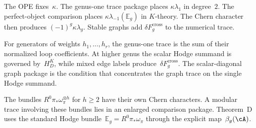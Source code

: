 \begin{remark}
\label{rem:universality-hierarchy}
The OPE fixes~$\kappa$.  The genus-one trace package places
$\kappa\lambda_1$ in degree~$2$.  The perfect-object comparison
places $\kappa\lambda_{-1}(\mathbb E_g)$ in $K$-theory.  The Chern
character then produces $(-1)^g\kappa\lambda_g$.  Stable graphs add
$\delta F_g^{\mathrm{cross}}$ to the numerical trace.
\end{remark}

\begin{remark}
\label{rem:multi-generator-obs}
For generators of weights $h_1,\ldots,h_r$, the genus-one trace is
the sum of their normalized loop coefficients.  At higher genus the
scalar Hodge summand is governed by~$H_D^K$, while mixed edge labels
produce~$\delta F_g^{\mathrm{cross}}$.  The scalar-diagonal graph
package is the condition that concentrates the graph trace on the
single Hodge summand.
\end{remark}

\begin{remark}
\label{rem:higher-hodge-genus2-diagnostic}
The bundles $R^0\pi_*\omega_\pi^{\otimes h}$ for $h\ge2$ have their
own Chern characters.  A modular trace involving these bundles lies
in an enlarged comparison package.  Theorem~D uses the standard
Hodge bundle~$\mathbb E_g=R^0\pi_*\omega_\pi$ through the explicit
map~$\beta_g(\cA)$.
\end{remark}


